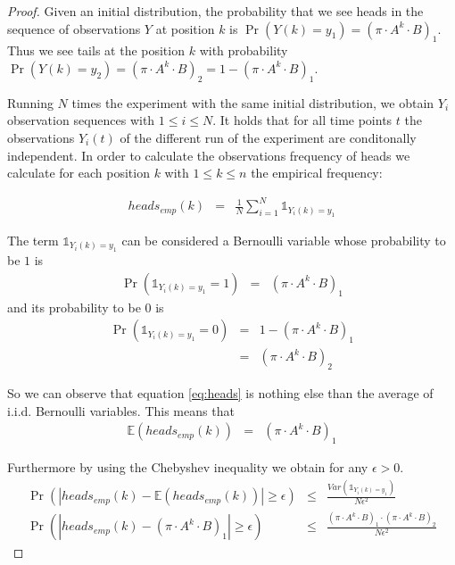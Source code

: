 \documentclass[a4paper, 12pt, titlepage]{article}
\begin{document}
\begin{proof}

Given an initial distribution, the probability that we see heads in the sequence of observations $Y$ at position $k$ is $\Pr(Y(k)=y_1)=(\pi \cdot A^k \cdot B)_1$.
Thus we see tails at the position $k$ with probability $\Pr(Y(k)=y_2)=(\pi \cdot A^k \cdot B)_2 = 1- (\pi \cdot A^k \cdot B)_1$.

Running $N$ times the experiment with the same initial distribution, we obtain $Y_i$ observation sequences with $1\le i \le N$.
It holds that for all time points $t$ the observations $Y_i(t)$ of the different run of the experiment are conditonally independent.
In order to calculate the observations frequency of heads we calculate for each position $k$ with $1\le k \le n$ the empirical frequency:

\begin{eqnarray}
	heads_{emp}(k) &=& \frac{1}{N}\sum_{i=1}^N \mathds{1}_{Y_i(k)=y_1} \label{eq:heads}
\end{eqnarray}

The term $\mathds{1}_{Y_i(k)=y_1}$ can be considered a Bernoulli variable whose probability to be $1$ is
\begin{eqnarray*}
	\Pr(\mathds{1}_{Y_i(k)=y_1}=1) &=& (\pi \cdot A^k \cdot B)_1
\end{eqnarray*}
and its probability to be $0$ is
\begin{eqnarray*}
	\Pr(\mathds{1}_{Y_i(k)=y_1}=0) &=& 1-(\pi \cdot A^k \cdot B)_1\\
	&=& (\pi \cdot A^k \cdot B)_2
\end{eqnarray*}

So we can observe that equation \eqref{eq:heads} is nothing else than the average of i.i.d. Bernoulli variables.
This means that
\begin{eqnarray*}
	\mathds{E}( heads_{emp}(k) ) &=& (\pi \cdot A^k \cdot B)_1
\end{eqnarray*}

Furthermore by using the Chebyshev inequality we obtain for any $\epsilon > 0$.
\begin{eqnarray}
	\Pr(\left | heads_{emp}(k) - \mathds{E}( heads_{emp}(k) ) \right | \ge \epsilon ) &\le & \frac{Var(\mathds{1}_{Y_i(k)=y_1})}{N\epsilon^2} \nonumber\\
	\Pr(\left | heads_{emp}(k) - (\pi \cdot A^k \cdot B)_1 \right | \ge \epsilon ) &\le & \frac{(\pi \cdot A^k \cdot B)_1\cdot (\pi \cdot A^k \cdot B)_2}{N\epsilon^2} \label{eq:final}
\end{eqnarray}


\end{proof}
\end{document}
